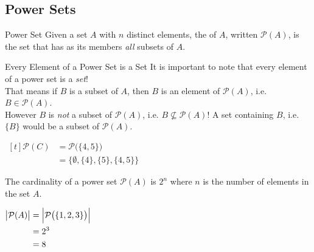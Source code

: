 \documentclass[../notes.tex]{subfiles}
\begin{document}
			\subsection{Power Sets}
				\begin{definition}{Power Set}
					Given a set $A$ with $n$ distinct elements, the  of $A$, written $\mathcal{P}(A)$, is the set that has as its members \emph{all} subsets of $A$.
				\end{definition}
				\nopagebreak
				\begin{sidenote}{Every Element of a Power Set is a Set}
					It is important to note that every element of a power set is a \emph{set}!\\ That means if $B$ is a subset of $A$, then $B$ is an element of $\mathcal{P}(A)$, i.e. $B \in \mathcal{P}(A)$.\\
					However $B$ is \emph{not} a subset of $\mathcal{P}(A)$, i.e. $B \nsubseteq \mathcal{P}(A)$! A set containing $B$, i.e. $\{B\}$ would be a subset of $\mathcal{P}(A)$.
				\end{sidenote}
				\nopagebreak
				\begin{example}[hbox] $
					\begin{aligned}[t]
						\mathcal{P}(C) &= \mathcal{P}\bigl(\{4, 5\}\bigr)\\
						&= \bigl\{\emptyset, \{4\}, \{5\}, \{4, 5\}\bigr\}
					\end{aligned} $
				\end{example}
				The cardinality of a power set $\mathcal{P}(A)$ is $2^{n}$ where $n$ is the number of elements in the set $A$.
				\begin{example}[hbox] $
					\begin{aligned}[t]
						\bigl\lvert \mathcal{P}(A)\bigr\rvert &= \Bigl\lvert\mathcal{P}\bigl(\{1, 2, 3\}\bigr)\Bigr\rvert\\
						&= 2^{3}\\
						&= 8
					\end{aligned} $
				\end{example}
			\pagebreak
\end{document}
